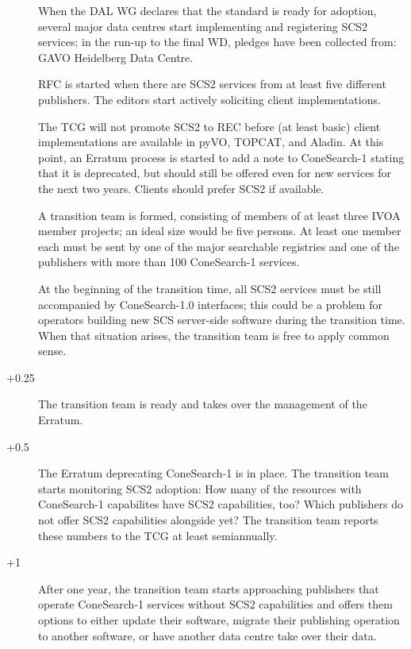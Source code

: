 \documentclass[11pt,a4paper]{ivoa}
\begin{document}
\begin{description}
\item[] When the DAL WG declares that the standard is ready
for adoption, several major data centres start implementing and
registering SCS2 services; in the run-up to the final WD, pledges have
been collected from: GAVO Heidelberg Data
Centre.

\item[] RFC is started when there are SCS2 services from at
least five different publishers.  The editors start actively soliciting
client implementations.

\item[] The TCG will not promote SCS2 to REC before (at least
basic) client implementations are available in pyVO, TOPCAT, and Aladin.
At this point, an Erratum process is started to add a note to
ConeSearch-1 stating that it is deprecated, but should still be offered
even for new services for the next two years.  Clients should prefer
SCS2 if available.

A transition team is formed, consisting of members of at least three
IVOA member projects; an ideal size would be five persons.  At least one
member each must be sent by one of the major searchable registries and
one of the publishers with more than 100 ConeSearch-1 services.

At the beginning of the transition time, all SCS2 services must be still
accompanied by ConeSearch-1.0 interfaces; this could be a problem for
operators building new SCS server-side software during the transition time.
When that situation arises, the transition team is free to apply common
sense.

\item[+0.25] The transition team is ready and takes over the
management of the Erratum.

\item[+0.5] The Erratum deprecating ConeSearch-1 is in place.  The
transition team starts monitoring SCS2 adoption: How many of the
resources with ConeSearch-1 capabilites have SCS2 capabilities, too?
Which publishers do not offer SCS2 capabilities alongside yet?  The
transition team reports these numbers to the TCG at least semiannually.

\item[+1]  After one year, the transition team starts
approaching publishers that operate ConeSearch-1 services without SCS2
capabilities and offers them options to either update their software,
migrate their publishing operation to another software, or have another
data centre take over their data.


\end{description}
\end{document}
